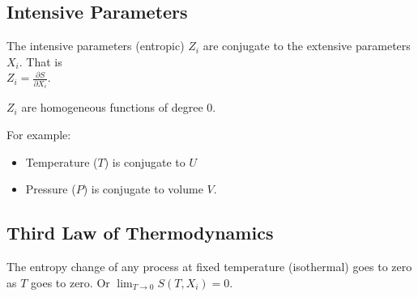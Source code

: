 \subsection{Intensive Parameters}

The intensive parameters (entropic) $Z_i$ are conjugate to the extensive parameters $X_i$. That is \\ $Z_i = \frac{\partial S}{\partial X_i}$.

$Z_i$ are homogeneous functions of degree 0. 

For example:

\begin{itemize}

\item Temperature ($T$) is conjugate to $U$
\item Pressure ($P$) is conjugate to volume $V$.

\end{itemize}

\subsection{Third Law of Thermodynamics}

The entropy change of any process at fixed temperature (isothermal) goes to zero as $T$ goes to zero. Or $\lim_{T \rightarrow 0} S(T, X_i) = 0$.